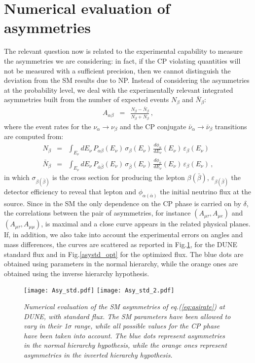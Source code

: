 \documentclass[12pt]{article}
\begin{document}
\section{Numerical evaluation of asymmetries}
\label{num_asy}


The relevant question now is related to the experimental capability to  measure the asymmetries we are considering: in fact, if the CP violating quantities will not be  measured  with a sufficient precision, then we cannot distinguish the deviation from the SM results due to NP. Instead of considering the asymmetries at the probability level, we deal with the experimentally  relevant  integrated  asymmetries built from the number of expected events $N_\beta$ and $\bar N_\beta$:
\begin{eqnarray}
\label{eq:asirate}
A_{\alpha \beta} &=&\frac{N_\beta-\bar N_\beta}{N_\beta+\bar N_\beta}\,,
\end{eqnarray}
where the event rates for the $\nu_\alpha \to \nu_\beta$ and the CP conjugate $\bar\nu_\alpha \to \bar\nu_\beta$ transitions are computed from:
\begin{eqnarray}
\label{eq:asirate2}
N_\beta &=&\int_{E_\nu} dE_\nu \,P_{\alpha \beta}(E_\nu)\,\sigma_\beta(E_\nu)\,\frac{d\phi_\alpha}{dE_\nu}(E_\nu) \,\varepsilon_\beta(E_\nu) \\
\bar N_\beta &=&\int_{E_\nu} dE_\nu \,P_{\bar\alpha \bar\beta}(E_\nu)\,\sigma_{\bar\beta}(E_\nu)\,\frac{d\phi_{\bar\alpha}}{dE_\nu}(E_\nu) \,\varepsilon_\beta(E_\nu)\,,
\end{eqnarray} 
in which $\sigma_{\beta (\bar \beta)}$ is the cross section for producing the lepton $\beta(\bar \beta)$,  
$\varepsilon_{\beta(\bar \beta)}$ the detector efficiency to reveal that lepton and  $\phi_{\alpha(\bar \alpha)}$ the initial neutrino flux at the source.
Since in the SM the only dependence on the CP phase is carried on by $\delta$, the correlations between the pair of asymmetries, for instance $(A_{\mu\tau},A_{\mu e})$ and $(A_{\mu\tau},A_{\mu \mu})$, is maximal and a close curve appears in the related physical planes. If, in addition, we also take into account the experimental errors on angles and mass differences, the curves are scattered as reported in Fig.\ref{asystd}, for the DUNE standard flux and in Fig.\ref{asystd_opt} for the optimized flux. The blue dots are obtained using parameters in the normal hierarchy, while the orange ones are obtained using the inverse hierarchy hypothesis.
\begin{figure}
    \centering
    \texttt{[image: Asy\_std.pdf]}
    \texttt{[image: Asy\_std\_2.pdf]}
    \caption{\it Numerical evaluation of the SM asymmetries of eq.(\ref{eq:asirate}) at DUNE, with standard flux. The SM parameters have been allowed to vary in their 1$\sigma$ range, while all possible values for the CP phase have been taken into account. The blue dots represent asymmetries in the normal hierarchy hypothesis, while the orange ones represent asymmetries in the inverted hierarchy hypothesis. }
    \label{asystd}
\end{figure}
\end{document}
